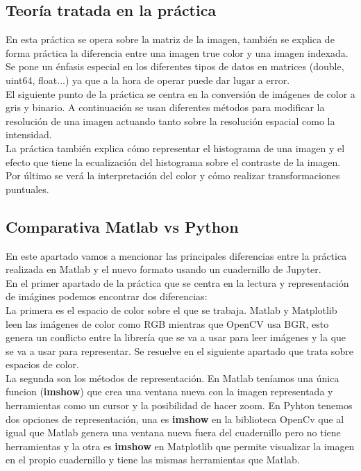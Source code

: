 \documentclass[a4paper,12pt]{report}
\begin{document}
\subsection{Teoría tratada en la práctica}

En esta práctica se opera sobre la matriz de la imagen, también se explica de forma práctica la diferencia entre una imagen true color y una imagen indexada. Se pone un énfasis especial en los diferentes tipos de datos en matrices (double, uint64, float...) ya que a la hora de operar puede dar lugar a error.\\

El siguiente punto de la práctica se centra en la conversión de imágenes de color a gris y binario. A continuación se usan diferentes métodos para modificar la resolución de una imagen actuando tanto sobre la resolución espacial como la intensidad.\\

La práctica también explica cómo representar el histograma de una imagen y el efecto que tiene la ecualización del histograma sobre el contraste de la imagen.\\

Por último se verá la interpretación del color y cómo realizar transformaciones puntuales.\\

\subsection{Comparativa Matlab vs Python}

En este apartado vamos a mencionar las principales diferencias entre la práctica realizada en Matlab y el nuevo formato usando un cuadernillo de Jupyter.\\

En el primer apartado de la práctica que se centra en la lectura y representación de imágines podemos encontrar dos diferencias:\\

La primera es el espacio de color sobre el que se trabaja. Matlab y Matplotlib leen las imágenes de color como RGB mientras que OpenCV usa BGR, esto genera un conflicto entre la librería que se va a usar para leer imágenes y la que se va a usar para representar. Se resuelve en el siguiente apartado que trata sobre espacios de color.\\

La segunda son los métodos de representación. En Matlab teníamos una única funcion (\textbf{imshow}) que crea una ventana nueva con la imagen representada y herramientas como un cursor y la posibilidad de hacer zoom. En Pyhton tenemos dos opciones de representación, una es \textbf{imshow} en la biblioteca  OpenCv que al igual que Matlab genera una ventana nueva fuera del cuadernillo pero no tiene herramientas y la otra es \textbf{imshow} en Matplotlib que permite visualizar la imagen en el propio cuadernillo y tiene las mismas herramientas que Matlab.\\
\end{document}
